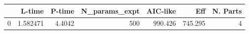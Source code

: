 \begin{tabular}{lrrrrrr}
\toprule
{} &    L-time &  P-time &  N\_params\_expt &  AIC-like &      Eff &  N. Parts \\
\midrule
0 &  1.582471 &  4.4042 &            500 &   990.426 &  745.295 &         4 \\
\bottomrule
\end{tabular}
